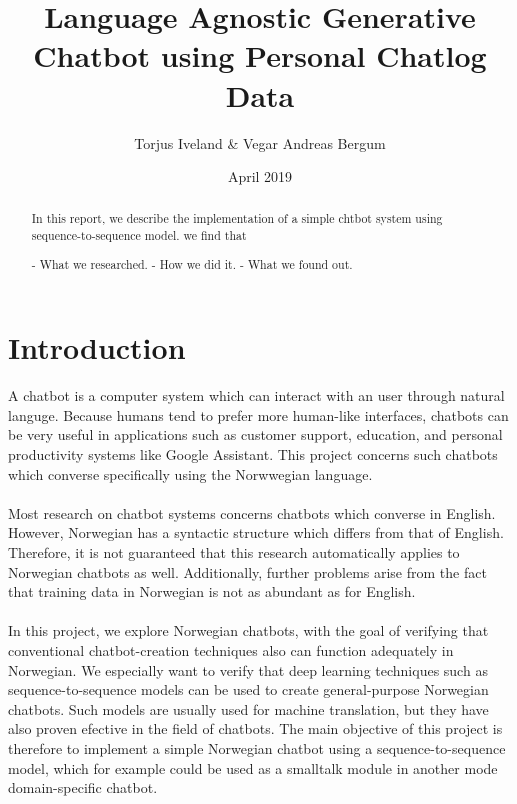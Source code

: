 \documentclass{article}
\title{Language Agnostic Generative Chatbot using Personal Chatlog Data}
\author{Torjus Iveland \& Vegar Andreas Bergum}
\date{April 2019}
\begin{document}
\maketitle

\begin{abstract}

In this report, we describe the implementation of a simple chtbot system
using sequence-to-sequence model. we find that

\if
- What we researched.
- How we did it.
- What we found out.
\fi
\end{abstract}

\section{Introduction}

A chatbot is a computer system which can interact with an user through natural
languge. Because humans tend to prefer more human-like interfaces, chatbots can
be very useful in applications
such as customer support, education, and personal productivity systems like
Google Assistant.  This project concerns such chatbots which converse
specifically using the Norwwegian language.

\paragraph{}
Most research on chatbot systems concerns chatbots which converse in English.
However, Norwegian has a syntactic structure which differs from that of
English. Therefore, it is not guaranteed that this research automatically
applies to Norwegian chatbots as well. Additionally, further problems arise
from the fact that training data in Norwegian is not as abundant as for
English.

\paragraph{}
In this project, we explore Norwegian chatbots, with the goal of verifying that
conventional chatbot-creation techniques also can function adequately in
Norwegian. We especially want to verify that deep learning techniques such as
sequence-to-sequence models \cite{Cho2014} can be used to create
general-purpose Norwegian chatbots. Such models are usually used for machine
translation, but they have also proven efective in the field of chatbots. The
main objective of this project is therefore to implement a simple Norwegian
chatbot using a sequence-to-sequence model, which for example could be used as
a smalltalk module in another mode domain-specific chatbot.
\end{document}
